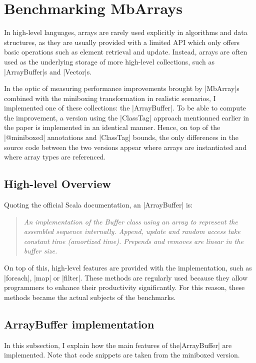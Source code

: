 \section{Benchmarking MbArrays}
\label{sec:bench}

In high-level languages, arrays are rarely used explicitly in algorithms and data structures, as they are usually provided with a limited API which only offers basic operations such as element retrieval and update. Instead, arrays are often used as the underlying storage of more high-level collections, such as |ArrayBuffer|s and |Vector|s.

In the optic of measuring performance improvements brought by |MbArray|s combined with the miniboxing transformation in realistic scenarios, I implemented one of these collections: the |ArrayBuffer|. To be able to compute the improvement, a version using the |ClassTag| approach mentionned earlier in the paper is implemented in an identical manner. Hence, on top of the |@miniboxed| annotations and |ClassTag| bounds, the only differences in the source code between the two versions appear where arrays are instantiated and where array types are referenced. 

\subsection{High-level Overview}

Quoting the official Scala documentation, an |ArrayBuffer| is: 
\begin{quote}
\textit{An implementation of the Buffer class using an array to represent the assembled sequence internally. Append, update and random access take constant time (amortized time). Prepends and removes are linear in the buffer size.} 
\end{quote}

On top of this, high-level features are provided with the implementation, such as |foreach|, |map| or |filter|. These methods are regularly used because they allow programmers to enhance their productivity significantly. For this reason, these methods became the actual subjects of the benchmarks.

\subsection{ArrayBuffer implementation}

In this subsection, I explain how the main features of the\linebreak |ArrayBuffer| are implemented. Note that code snippets are taken from the miniboxed version.

